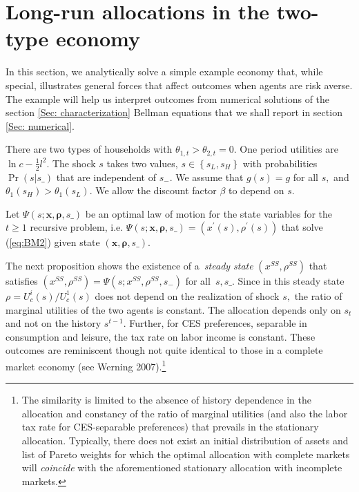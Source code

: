 \documentclass[thmsb,11pt]{article}
\begin{document}
{\smallskip





\section{\protect\smallskip Long-run allocations in the two-type economy
\label{sec: longrun anatyt}}

In this section, we analytically solve  a simple example economy that, while special, illustrates general forces that affect outcomes when agents are risk averse.
The example will help us  interpret  outcomes from numerical solutions of the section \ref{Sec: characterization} Bellman equations that
we shall report in section %
\ref{Sec: numerical}.

\smallskip There are  two types of households with $%
\theta _{1,t}>\theta _{2,t}=0$. One period utilities are $\ln c-\frac{1}{2}%
l^{2}.$ The shock $s$  takes  two values, $s\in \left\{
s_{L},s_{H}\right\} $ with probabilities $\Pr \left( s|s\_\right) $ that are
independent of $s_{-}.$ We assume that $g\left( s\right) =g$ for all $s,$
and $\theta _{1}\left( s_{H}\right) >\theta _{1}\left( s_{L}\right) .$ We allow the discount factor $\beta $ to depend on  $s.$

Let $\Psi \left( s;\mathbf{x},\mathbf{\rho },s\_\right) $ be an optimal  law of motion for the state variables
for the $t\geq1$ recursive problem, i.e. $\Psi \left( s;\mathbf{x},%
\mathbf{\rho },s\_\right) =\left( x^{\prime }\left( s\right) ,\rho ^{\prime
}\left( s\right) \right) $ that solve (\ref{eq:BM2}) given state $\left(
\mathbf{x},\mathbf{\rho },s\_\right) .$

\smallskip The next proposition shows the existence of a\textit{\ steady
state} $\left( x^{SS},\rho ^{SS}\right) $ that satisfies $\left( x^{SS},\rho
^{SS}\right) =\Psi \left( s;x^{SS},\rho ^{SS},s_{-}\right) $ for all $%
\,s,s\_.$ Since in this steady state $\rho =U_{c}^{i}(s)/U_{c}^{1}(s)$ does
not depend on the realization of shock $s,$ the ratio of marginal utilities
of the two agents is constant. The allocation depends only on  $s_{t}$ and not on the  history $s^{t-1}$.  Further, for CES preferences, separable in consumption and leisure, the tax rate on labor income is constant. These outcomes are reminiscent though not quite identical
 to those in a complete market economy (see Werning
2007).\footnote{The similarity is limited to the absence of  history dependence in the allocation  and constancy of the  ratio of marginal utilities (and also the labor tax rate for CES-separable preferences) that prevails in the stationary allocation. Typically, there does not exist an initial distribution of  assets  and list of Pareto weights for which the optimal allocation with complete markets will \emph{coincide} with the aforementioned stationary allocation with incomplete markets.}



}
\end{document}
